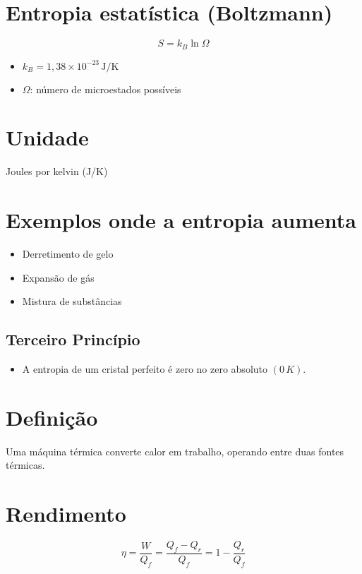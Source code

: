 \documentclass[a4paper,12pt]{article}
\begin{document}
\begin{multicols}{2}
\section*{Entropia estatística (Boltzmann)}

\[
S = k_B \ln \Omega
\]

\begin{itemize}
  \item \( k_B = 1{,}38 \times 10^{-23} \, \text{J/K} \)
  \item \( \Omega \): número de microestados possíveis
\end{itemize}

\section*{Unidade}
Joules por kelvin (J/K)

\section*{Exemplos onde a entropia aumenta}
\begin{itemize}
  \item Derretimento de gelo
  \item Expansão de gás
  \item Mistura de substâncias
\end{itemize}

\subsection{Terceiro Princípio}
\begin{itemize}
    \item A entropia de um cristal perfeito é zero no zero absoluto $(0\,K)$.
\end{itemize}

\section{Definição}

Uma máquina térmica converte calor em trabalho, operando entre duas fontes térmicas.

\section{Rendimento}

\[
\eta = \frac{W}{Q_f} = \frac{Q_f - Q_r}{Q_f} = 1 - \frac{Q_r}{Q_f}
\]


\end{multicols}
\end{document}
